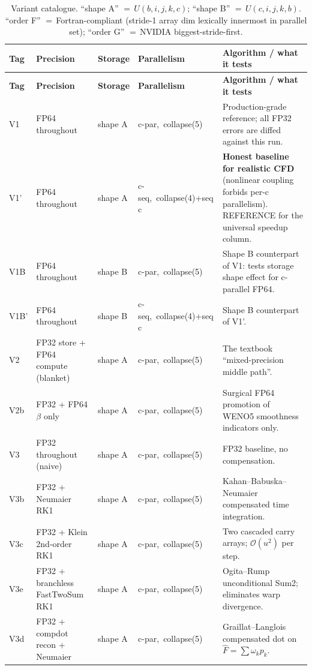 \documentclass[11pt,a4paper]{article}
\begin{document}
{\footnotesize
\begin{longtable}{@{}p{1.0cm}p{2.2cm}p{2.5cm}p{2.4cm}p{6.5cm}@{}}
\caption{Variant catalogue.  ``shape A'' \(=\,U(b,i,j,k,c)\); ``shape B'' \(=\,U(c,i,j,k,b)\). ``order F'' \(=\,\)Fortran-compliant (stride-1 array dim lexically innermost in parallel set); ``order G'' \(=\,\)NVIDIA biggest-stride-first.} \label{tab:variants} \\
\toprule
\textbf{Tag} & \textbf{Precision} & \textbf{Storage} & \textbf{Parallelism} & \textbf{Algorithm / what it tests} \\
\midrule
\endfirsthead
\toprule
\textbf{Tag} & \textbf{Precision} & \textbf{Storage} & \textbf{Parallelism} & \textbf{Algorithm / what it tests} \\
\midrule
\endhead
V1     & FP64 throughout & shape A & c-par,~collapse(5)      & Production-grade reference; all FP32 errors are diffed against this run. \\
V1'    & FP64 throughout & shape A & c-seq,~collapse(4)+seq c & \textbf{Honest baseline for realistic CFD} (nonlinear coupling forbids per-c parallelism). REFERENCE for the universal speedup column. \\
V1B    & FP64 throughout & shape B & c-par,~collapse(5)      & Shape B counterpart of V1: tests storage shape effect for c-parallel FP64. \\
V1B'   & FP64 throughout & shape B & c-seq,~collapse(4)+seq c & Shape B counterpart of V1'. \\
V2     & FP32 store + FP64 compute (blanket) & shape A & c-par,~collapse(5) & The textbook ``mixed-precision middle path''. \\
V2b    & FP32 + FP64 \(\beta\) only & shape A & c-par,~collapse(5) & Surgical FP64 promotion of WENO5 smoothness indicators only. \\
V3     & FP32 throughout (naive) & shape A & c-par,~collapse(5) & FP32 baseline, no compensation. \\
V3b    & FP32 + Neumaier RK1 & shape A & c-par,~collapse(5)   & Kahan--Babuska--Neumaier compensated time integration. \\
V3c    & FP32 + Klein 2nd-order RK1 & shape A & c-par,~collapse(5) & Two cascaded carry arrays; \(\mathcal{O}(u^2)\) per step. \\
V3e    & FP32 + branchless FastTwoSum RK1 & shape A & c-par,~collapse(5) & Ogita--Rump unconditional Sum2; eliminates warp divergence. \\
V3d    & FP32 + compdot recon + Neumaier & shape A & c-par,~collapse(5) & Graillat--Langlois compensated dot on \(\hat F = \sum\omega_k p_k\). \\

\end{longtable}}
\end{document}
